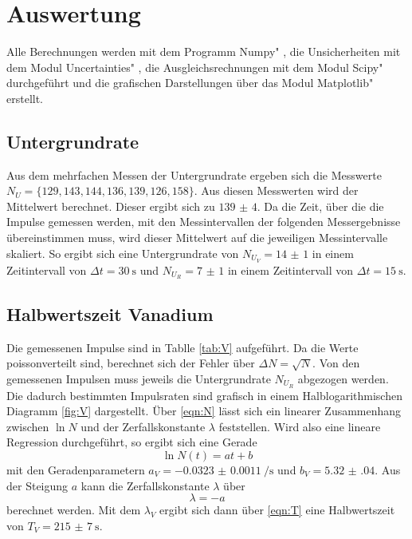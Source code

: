 \section{Auswertung}
\label{sec:Auswertung}

Alle Berechnungen werden mit dem Programm \glqq Numpy" \cite{numpy}, die Unsicherheiten mit dem Modul \glqq Uncertainties" \cite{uncertainties}, die Ausgleichsrechnungen mit dem Modul \glqq Scipy" \cite{scipy} durchgeführt und die grafischen Darstellungen über das Modul \glqq Matplotlib" \cite{matplotlib} erstellt.

\subsection{Untergrundrate}

Aus dem mehrfachen Messen der Untergrundrate ergeben sich die Messwerte $N_U=\{ 129, 143, 144, 136, 139, 126, 158 \}$. Aus diesen Messwerten wird der Mittelwert berechnet. Dieser ergibt sich zu $\num{139(4)}$. Da die Zeit, über die die Impulse gemessen werden, mit den Messintervallen der folgenden Messergebnisse übereinstimmen muss, wird  dieser Mittelwert auf die jeweiligen Messintervalle skaliert. So ergibt sich eine Untergrundrate von $N_{U_V}=\num{14(1)}$ in einem Zeitintervall von $\Delta t=\SI{30}{\s}$ und $N_{U_R}=\num{7(1)}$ in einem Zeitintervall von $\Delta t=\SI{15}{\s}$.

\subsection{Halbwertszeit Vanadium}
\label{Vanadium}

Die gemessenen Impulse sind in Tablle \ref{tab:V} aufgeführt. Da die Werte poissonverteilt sind, berechnet sich der Fehler über $\Delta N=\sqrt{N}$. Von den gemessenen Impulsen muss jeweils die Untergrundrate $N_{U_R}$ abgezogen werden. Die dadurch bestimmten Impulsraten sind grafisch in einem Halblogarithmischen Diagramm \ref{fig:V} dargestellt. Über \eqref{eqn:N} lässt sich ein linearer Zusammenhang zwischen $\ln{N}$ und der Zerfallskonstante $\lambda $ feststellen. Wird also eine lineare Regression durchgeführt, so ergibt sich eine Gerade
\begin{equation}
    \ln{N}(t)=at + b
    \label{eqn:gerade}
\end{equation}
mit den Geradenparametern $a_V=\SI[per-mode=reciprocal]{-0.0323(00011)}{\per\s}$ und $b_V=\num{5.32(04)}$. 
Aus der Steigung $a$ kann die Zerfallskonstante $\lambda$ über
\begin{equation}
    \lambda=-a
\label{eqn:lamb}
\end{equation}
berechnet werden. Mit dem $\lambda_V$ ergibt sich dann über \eqref{eqn:T} eine Halbwertszeit von 
${T_V=\SI{215(7)}{\s}}$.


